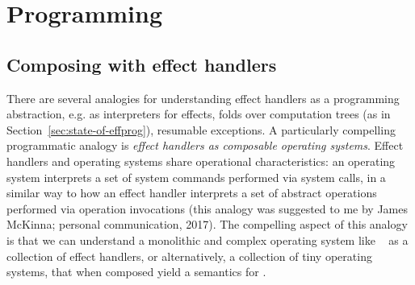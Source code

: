 \documentclass[12pt,phd,lfcs,twoside,openright,logo,leftchapter,normalheadings]{infthesis}
\theoremstyle{plain}
\theoremstyle{definition}
\newtheorem{definition}[theorem]{Definition}
\begin{document}



\part{Programming}
\label{p:design}

\chapter{Composing \UNIX{} with effect handlers}
\label{ch:ehop}

There are several analogies for understanding effect handlers as a
programming abstraction, e.g. as interpreters for effects, folds over
computation trees (as in Section~\ref{sec:state-of-effprog}),
resumable exceptions. A particularly compelling programmatic analogy
is \emph{effect handlers as composable operating systems}. Effect
handlers and operating systems share operational characteristics: an
operating system interprets a set of system commands performed via
system calls, in a similar way to how an effect handler interprets a
set of abstract operations performed via operation invocations (this
analogy was suggested to me by James McKinna; personal communication,
2017).
%
The compelling aspect of this analogy is that we can understand a
monolithic and complex operating system like \UNIX{}~\cite{RitchieT74}
as a collection of effect handlers, or alternatively, a collection of
tiny operating systems, that when composed yield a semantics for
\UNIX{}.
\end{document}
